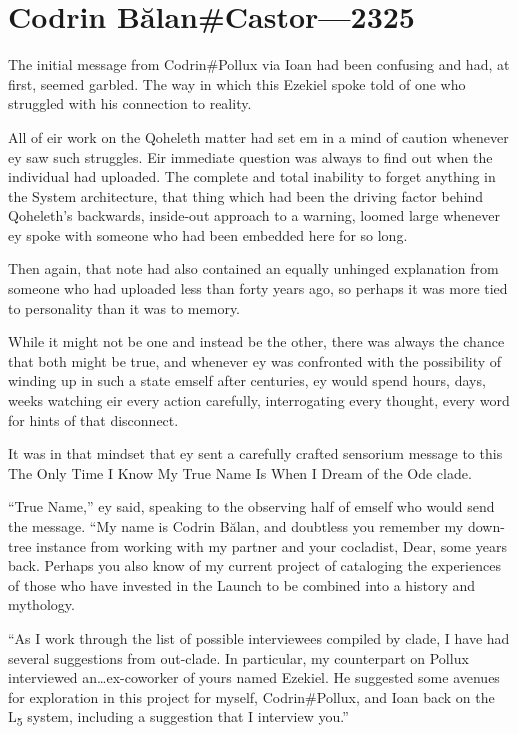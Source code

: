 \hypertarget{codrin-bux103lancastor-2325}{%
\chapter{Codrin Bălan\#Castor—2325}\label{codrin-bux103lancastor-2325}}

The initial message from Codrin\#Pollux via Ioan had been confusing and had, at first, seemed garbled. The way in which this Ezekiel spoke told of one who struggled with his connection to reality.

All of eir work on the Qoheleth matter had set em in a mind of caution whenever ey saw such struggles. Eir immediate question was always to find out when the individual had uploaded. The complete and total inability to forget anything in the System architecture, that thing which had been the driving factor behind Qoheleth's backwards, inside-out approach to a warning, loomed large whenever ey spoke with someone who had been embedded here for so long.

Then again, that note had also contained an equally unhinged explanation from someone who had uploaded less than forty years ago, so perhaps it was more tied to personality than it was to memory.

While it might not be one and instead be the other, there was always the chance that both might be true, and whenever ey was confronted with the possibility of winding up in such a state emself after centuries, ey would spend hours, days, weeks watching eir every action carefully, interrogating every thought, every word for hints of that disconnect.

It was in that mindset that ey sent a carefully crafted sensorium message to this The Only Time I Know My True Name Is When I Dream of the Ode clade.

``True Name,'' ey said, speaking to the observing half of emself who would send the message. ``My name is Codrin Bălan, and doubtless you remember my down-tree instance from working with my partner and your cocladist, Dear, some years back. Perhaps you also know of my current project of cataloging the experiences of those who have invested in the Launch to be combined into a history and mythology.

``As I work through the list of possible interviewees compiled by clade, I have had several suggestions from out-clade. In particular, my counterpart on Pollux interviewed an\ldots ex-coworker of yours named Ezekiel. He suggested some avenues for exploration in this project for myself, Codrin\#Pollux, and Ioan back on the L\textsubscript{5} system, including a suggestion that I interview you.''

